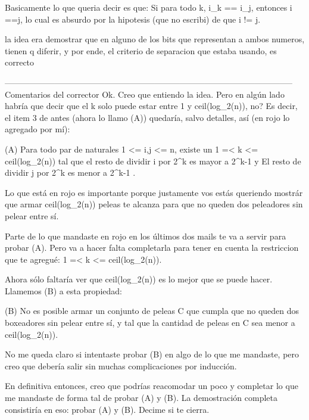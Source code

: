 Basicamente lo que queria decir es que:
Si para todo k, i_k == i_j,    entonces i ==j, lo cual es absurdo por la hipotesis (que no escribi) de que i != j.

la idea era demostrar que en alguno de los bits que representan a ambos numeros, tienen q diferir, y por ende, el criterio de separacion que estaba usando, es correcto

--------------------------------------------------------------------------------------------------------
Comentarios del corrector
Ok. Creo que entiendo la idea. Pero en algún lado habría que decir que el k solo puede estar entre 1 y ceil(log_2(n)), no? Es decir, el item 3 de antes (ahora lo llamo (A)) quedaría, salvo detalles, así (en rojo lo agregado por mí):

(A) Para todo par de naturales 1 <= i,j <= n, existe un 1 =< k <= ceil(log_2(n)) tal que el resto de dividir i por 2^k es mayor a 2^{k-1} y El resto de dividir j por 2^k es menor a 2^{k-1} .

Lo que está en rojo es importante porque justamente vos estás queriendo mostrár que armar ceil(log_2(n)) peleas te alcanza para que no queden dos peleadores sin pelear entre sí. 

Parte de lo que mandaste en rojo en los últimos dos mails te va a servir para probar (A). Pero va a hacer falta completarla para tener en cuenta la restriccion que te agregué: 1 =< k <= ceil(log_2(n)).

Ahora sólo faltaría ver que ceil(log_2(n)) es lo mejor que se puede hacer. Llamemos (B) a esta propiedad:

(B) No es posible armar un conjunto de peleas C que cumpla que no queden dos boxeadores sin pelear entre sí, y tal que la cantidad de peleas en C sea menor a ceil(log_2(n)). 

No me queda claro si intentaste probar (B) en algo de lo que me mandaste, pero creo que debería salir sin muchas complicaciones por inducción. 

En definitiva entonces, creo que podrías reacomodar un poco y completar lo que me mandaste de forma tal de probar (A) y (B). La demostración completa consistiría en eso: probar (A) y (B). Decime si te cierra.

